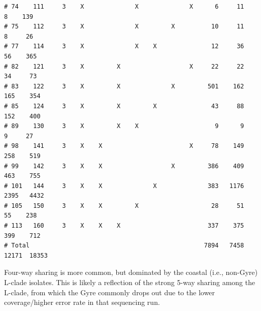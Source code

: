 \documentclass{article}\usepackage[]{graphicx}\usepackage[]{color}
\makeatletter
\newenvironment{kframe}{%
 \def\at@end@of@kframe{}%
 \ifinner\ifhmode%
  \def\at@end@of@kframe{\end{minipage}}%
  \begin{minipage}{\columnwidth}%
 \fi\fi%
 \def\FrameCommand##1{\hskip\@totalleftmargin \hskip-\fboxsep
 \colorbox{shadecolor}{##1}\hskip-\fboxsep
     \hskip-\linewidth \hskip-\@totalleftmargin \hskip\columnwidth}%
 \MakeFramed {\advance\hsize-\width
   \@totalleftmargin\z@ \linewidth\hsize
   \@setminipage}}%
 {\par\unskip\endMakeFramed%
 \at@end@of@kframe}
\newenvironment{knitrout}{}{} %
\makeatother
\begin{document}
\begin{knitrout}
\begin{kframe}
\begin{verbatim}
# 74    111     3    X              X              X      6     11      8    139
# 75    112     3    X              X         X          10     11      8     26
# 77    114     3    X              X    X               12     36     56    365
# 82    121     3    X         X                   X     22     22     34     73
# 83    122     3    X         X              X         501    162    165    354
# 85    124     3    X         X         X               43     88    152    400
# 89    130     3    X         X    X                     9      9      9     27
# 98    141     3    X    X                        X     78    149    258    519
# 99    142     3    X    X                   X         386    409    463    755
# 101   144     3    X    X              X              383   1176   2395   4432
# 105   150     3    X    X         X                    28     51     55    238
# 113   160     3    X    X    X                        337    375    399    712
# Total                                                7894   7458  12171  18353
\end{verbatim}
\end{kframe}
\end{knitrout}

Four-way sharing is more common, but dominated by the coastal (i.e., non-Gyre) L-clade isolates.  This is likely a
reflection of the strong 5-way sharing among the L-clade, from which the Gyre commonly drops out due to the lower
coverage/higher error rate in that sequencing run.
\end{document}
